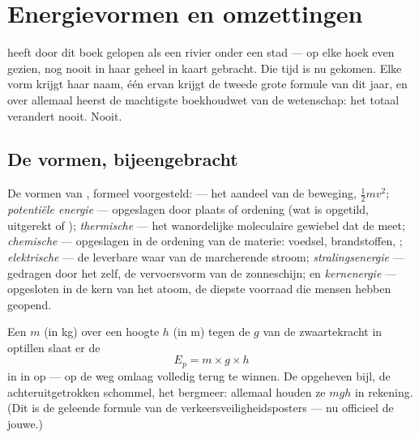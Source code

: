 \chapter{Energievormen en omzettingen}\label{ch:g9:energy-conversions}

 heeft door dit boek gelopen als een rivier onder een stad
--- op elke hoek even gezien, nog nooit in haar geheel in kaart
gebracht. Die tijd is nu gekomen. Elke vorm krijgt haar naam, één ervan
krijgt de tweede grote formule van dit jaar, en over allemaal heerst de
machtigste boekhoudwet van de wetenschap: het totaal verandert nooit.
Nooit.

\section{De vormen, bijeengebracht}

\begin{definition}\label{def:g9:energy-conversions:forms}
De vormen van , formeel voorgesteld:
\emph{} --- het aandeel van de beweging,
$\frac12 m v^2$; \emph{potentiële energie}
--- opgeslagen door plaats of ordening (wat is opgetild, uitgerekt of
); \emph{thermische
} --- het wanordelijke moleculaire gewiebel dat de
 meet; \emph{chemische
} --- opgeslagen in de ordening van de materie: voedsel,
brandstoffen, ; \emph{elektrische } --- de
leverbare waar van de marcherende stroom; \emph{stralingsenergie} ---
gedragen door het  zelf, de vervoersvorm van de zonneschijn;
en \emph{kernenergie} --- opgesloten in de kern van het atoom, de
diepste voorraad die mensen hebben geopend.
\end{definition}

\begin{proposition}\label{prop:g9:energy-conversions:ep}
Een  $m$ (in \unit{kg}) over een hoogte $h$ (in \unit{m})
tegen de $g$ van de zwaartekracht in optillen slaat er de
\[
E_p = m \times g \times h
\]
in  in op --- op de weg omlaag volledig terug te winnen. De
opgeheven bijl, de achteruitgetrokken schommel, het bergmeer: allemaal
houden ze $m g h$ in rekening. (Dit is de geleende formule van de
verkeersveiligheidsposters --- nu officieel de jouwe.)
\end{proposition}


